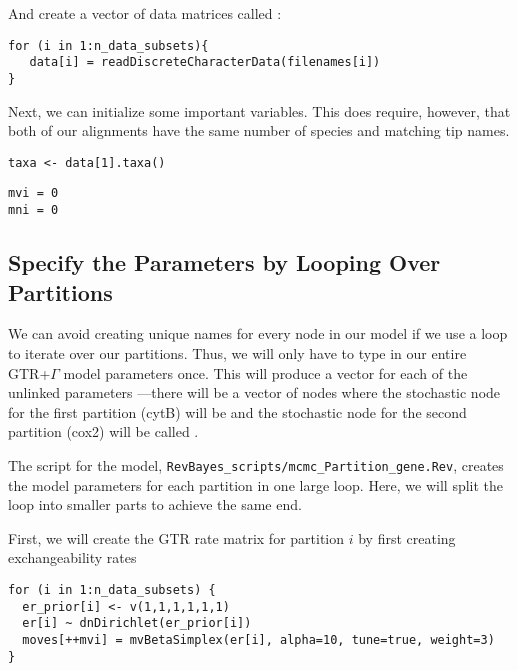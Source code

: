And create a vector of data matrices called :
{\tt \begin{snugshade*}
\begin{lstlisting}
for (i in 1:n_data_subsets){
   data[i] = readDiscreteCharacterData(filenames[i])
}
\end{lstlisting}
\end{snugshade*}}

Next, we can initialize some important variables. This does require, however, that both of our alignments have the same number of species and matching tip names.
{\tt \begin{snugshade*}
\begin{lstlisting}
taxa <- data[1].taxa()
\end{lstlisting}
\end{snugshade*}}

{\tt \begin{snugshade*}
\begin{lstlisting}
mvi = 0 
mni = 0
\end{lstlisting}
\end{snugshade*}}


\subsection{Specify the Parameters by Looping Over Partitions}

We can avoid creating unique names for every node in our model if we use a  loop to iterate over our partitions. Thus, we will only have to type in our entire GTR+$\Gamma$ model parameters once. 
This will produce a vector for each of the unlinked parameters ---\EG there will be a vector of  nodes where the stochastic node for the first partition (cytB) will be  and the stochastic node for the second partition (cox2) will be called .

The script for the model, {\tt RevBayes\_scripts/mcmc\_Partition\_gene.Rev}, creates the model parameters for each partition in one large loop.
Here, we will split the loop into smaller parts to achieve the same end.

First, we will create the GTR rate matrix for partition $i$ by first creating exchangeability rates
{\tt \small \begin{snugshade*}
\begin{lstlisting}
for (i in 1:n_data_subsets) {
  er_prior[i] <- v(1,1,1,1,1,1)
  er[i] ~ dnDirichlet(er_prior[i])
  moves[++mvi] = mvBetaSimplex(er[i], alpha=10, tune=true, weight=3) 
}
\end{lstlisting}
\end{snugshade*}}

